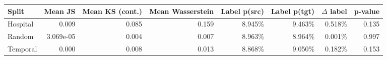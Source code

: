 \begin{tabular}{lrrrrrrr}
\toprule
Split & Mean JS & Mean KS (cont.) & Mean Wasserstein & Label p(src) & Label p(tgt) & $\Delta$ label & p-value \\
\midrule
Hospital & 0.009 & 0.085 & 0.159 & 8.945\% & 9.463\% & 0.518\% & 0.135 \\
Random & 3.069e-05 & 0.004 & 0.007 & 8.963\% & 8.964\% & 0.001\% & 0.997 \\
Temporal & 0.000 & 0.008 & 0.013 & 8.868\% & 9.050\% & 0.182\% & 0.153 \\
\bottomrule
\end{tabular}
